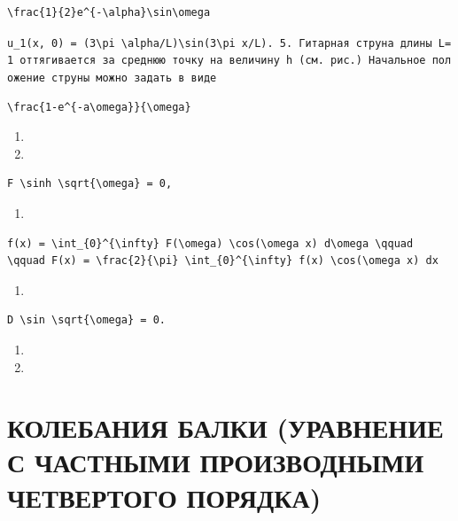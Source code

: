 \documentclass[
  ukrainian,
]{article}
\providecommand{\tightlist}{%
  \setlength{\itemsep}{0pt}\setlength{\parskip}{0pt}}
\begin{document}
\begin{verbatim}
\frac{1}{2}e^{-\alpha}\sin\omega
\end{verbatim}

\texttt{\textquotesingle{}u\_1(x,\ 0)\ =\ (3\textbackslash{}pi\ \textbackslash{}alpha/L)\textbackslash{}sin(3\textbackslash{}pi\ x/L).\textquotesingle{}\ 5.\ Гитарная\ струна\ длины\ L=1\ оттягивается\ за\ среднюю\ точку\ на\ величину\ h\ (см.\ рис.)\ Начальное\ положение\ струны\ можно\ задать\ в\ виде}

\begin{verbatim}
\frac{1-e^{-a\omega}}{\omega}
\end{verbatim}

\begin{enumerate}
\def\labelenumi{\arabic{enumi}.}
\setcounter{enumi}{13}
\tightlist
\item
\item
\end{enumerate}

\begin{verbatim}
F \sinh \sqrt{\omega} = 0,
\end{verbatim}

\begin{enumerate}
\def\labelenumi{\arabic{enumi}.}
\setcounter{enumi}{16}
\tightlist
\item
\end{enumerate}

\begin{verbatim}
f(x) = \int_{0}^{\infty} F(\omega) \cos(\omega x) d\omega \qquad \qquad F(x) = \frac{2}{\pi} \int_{0}^{\infty} f(x) \cos(\omega x) dx
\end{verbatim}

\begin{enumerate}
\def\labelenumi{\arabic{enumi}.}
\setcounter{enumi}{18}
\tightlist
\item
\end{enumerate}

\begin{verbatim}
D \sin \sqrt{\omega} = 0.
\end{verbatim}

\begin{enumerate}
\def\labelenumi{\arabic{enumi}.}
\setcounter{enumi}{18}
\tightlist
\item
\item
\end{enumerate}

\section{КОЛЕБАНИЯ БАЛКИ (УРАВНЕНИЕ С ЧАСТНЫМИ ПРОИЗВОДНЫМИ ЧЕТВЕРТОГО
ПОРЯДКА)}\label{ux43aux43eux43bux435ux431ux430ux43dux438ux44f-ux431ux430ux43bux43aux438-ux443ux440ux430ux432ux43dux435ux43dux438ux435-ux441-ux447ux430ux441ux442ux43dux44bux43cux438-ux43fux440ux43eux438ux437ux432ux43eux434ux43dux44bux43cux438-ux447ux435ux442ux432ux435ux440ux442ux43eux433ux43e-ux43fux43eux440ux44fux434ux43aux430}
\end{document}

